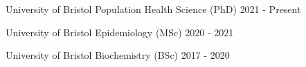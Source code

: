 

\begin{cveducation}

  \cvschool
    {University of Bristol} %
    {Population Health Science (PhD)} %
    {} %
    {2021 - Present} %
    {} %

  \cvschool
    {University of Bristol} %
    {Epidemiology (MSc)} %
    {} %
    {2020 - 2021} %
    {} %

 \cvschool
    {University of Bristol} %
    {Biochemistry (BSc)} %
    {} %
    {2017 - 2020} %
    {} %
    
\end{cveducation}
